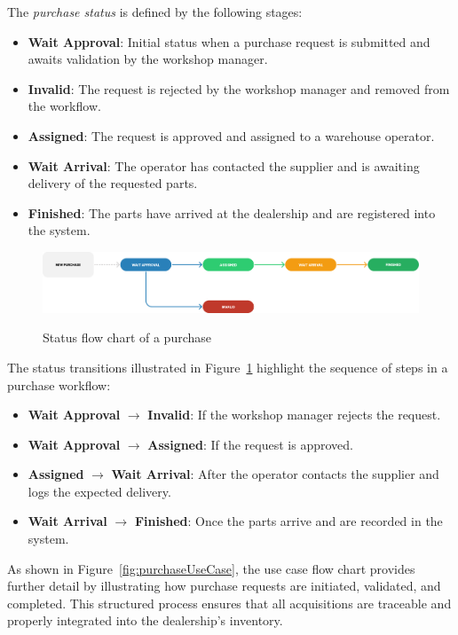 The \textit{purchase status} is defined by the following stages:
\begin{itemize}
\item \textbf{Wait Approval}: Initial status when a purchase request is submitted and awaits validation by the workshop manager.
\item \textbf{Invalid}: The request is rejected by the workshop manager and removed from the workflow.
\item \textbf{Assigned}: The request is approved and assigned to a warehouse operator.
\item \textbf{Wait Arrival}: The operator has contacted the supplier and is awaiting delivery of the requested parts.
\item \textbf{Finished}: The parts have arrived at the dealership and are registered into the system.
\end{itemize}

\begin{figure}[h]
  \caption{Status flow chart of a purchase}
  \centering
  \includegraphics[width=\textwidth]{figs/Status/Purchase/StatusDiagram}
  \label{fig:purchaseFlowChart}
\end{figure}

The status transitions illustrated in Figure~\ref{fig:purchaseFlowChart} highlight the sequence of steps in a purchase workflow:
\begin{itemize}
\item \textbf{Wait Approval} $\rightarrow$ \textbf{Invalid}: If the workshop manager rejects the request.
\item \textbf{Wait Approval} $\rightarrow$ \textbf{Assigned}: If the request is approved.
\item \textbf{Assigned} $\rightarrow$ \textbf{Wait Arrival}: After the operator contacts the supplier and logs the expected delivery.
\item \textbf{Wait Arrival} $\rightarrow$ \textbf{Finished}: Once the parts arrive and are recorded in the system.
\end{itemize}


As shown in Figure~\ref{fig:purchaseUseCase}, the use case flow chart provides further detail by illustrating how purchase requests are initiated, validated, and completed. This structured process ensures that all acquisitions are traceable and properly integrated into the dealership's inventory.

